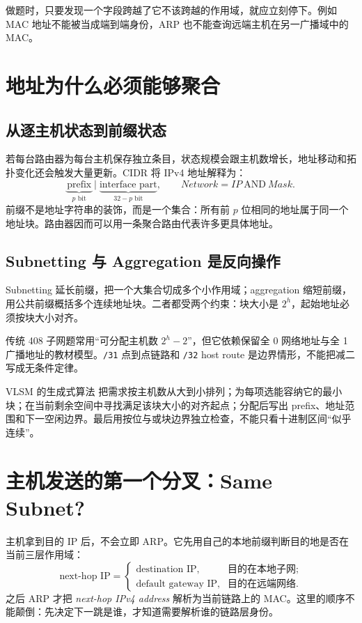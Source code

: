 \documentclass[11pt,a4paper]{ctexart}
\newcommand{\code}[1]{\texttt{#1}}
\begin{document}
做题时，只要发现一个字段跨越了它不该跨越的作用域，就应立刻停下。例如 MAC 地址不能被当成端到端身份，ARP 也不能查询远端主机在另一广播域中的 MAC。

\section{地址为什么必须能够聚合}

\subsection{从逐主机状态到前缀状态}

若每台路由器为每台主机保存独立条目，状态规模会跟主机数增长，地址移动和拓扑变化还会触发大量更新。CIDR 将 IPv4 地址解释为：
\[
\underbrace{\text{prefix}}_{p\text{ bit}}
\mid
\underbrace{\text{interface part}}_{32-p\text{ bit}},
\qquad
Network=IP\ \mathrm{AND}\ Mask.
\]
前缀不是地址字符串的装饰，而是一个集合：所有前 $p$ 位相同的地址属于同一个地址块。路由器因而可以用一条聚合路由代表许多更具体地址。

\subsection{Subnetting 与 Aggregation 是反向操作}

Subnetting 延长前缀，把一个大集合切成多个小作用域；aggregation 缩短前缀，用公共前缀概括多个连续地址块。二者都受两个约束：块大小是 $2^h$，起始地址必须按块大小对齐。

传统 408 子网题常用“可分配主机数 $2^h-2$”，但它依赖保留全 0 网络地址与全 1 广播地址的教材模型。\code{/31} 点到点链路和 \code{/32} host route 是边界情形，不能把减二写成无条件定律。

\begin{methodbox}{VLSM 的生成式算法}
把需求按主机数从大到小排列；为每项选能容纳它的最小块；在当前剩余空间中寻找满足该块大小的对齐起点；分配后写出 prefix、地址范围和下一空闲边界。最后用按位与或块边界独立检查，不能只看十进制区间“似乎连续”。
\end{methodbox}

\section{主机发送的第一个分叉：Same Subnet?}

主机拿到目的 IP 后，不会立即 ARP。它先用自己的本地前缀判断目的地是否在当前三层作用域：
\[
\text{next-hop IP}=
\begin{cases}
\text{destination IP}, & \text{目的在本地子网};\\
\text{default gateway IP}, & \text{目的在远端网络}.
\end{cases}
\]
之后 ARP 才把 \emph{next-hop IPv4 address} 解析为当前链路上的 MAC。这里的顺序不能颠倒：先决定下一跳是谁，才知道需要解析谁的链路层身份。
\end{document}
